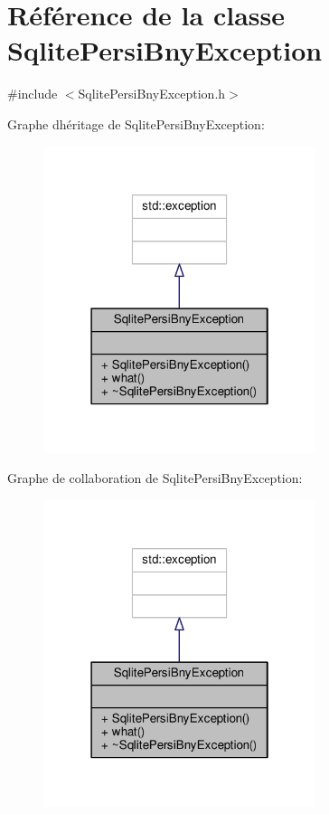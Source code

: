 \hypertarget{classSqlitePersiBnyException}{}\section{Référence de la classe Sqlite\+Persi\+Bny\+Exception}
\label{classSqlitePersiBnyException}


{\ttfamily \#include $<$Sqlite\+Persi\+Bny\+Exception.\+h$>$}



Graphe d\textquotesingle{}héritage de Sqlite\+Persi\+Bny\+Exception\+:\nopagebreak
\begin{figure}[H]
\begin{center}
\leavevmode
\includegraphics[width=226pt]{classSqlitePersiBnyException__inherit__graph}
\end{center}
\end{figure}


Graphe de collaboration de Sqlite\+Persi\+Bny\+Exception\+:\nopagebreak
\begin{figure}[H]
\begin{center}
\leavevmode
\includegraphics[width=226pt]{classSqlitePersiBnyException__coll__graph}
\end{center}
\end{figure}
